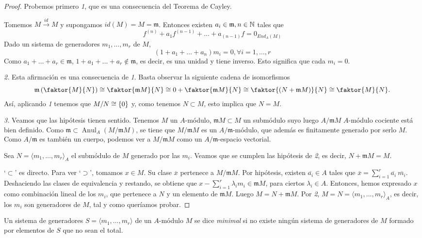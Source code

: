 \documentclass[../main.tex]{subfiles}
\begin{document}
\begin{proof}
	Probemos primero \textit{1}, que es una consecuencia del Teorema de Cayley.

	Tomemos $M\overset{id}{\longrightarrow}M$ y supongamos $id(M)=M=\mathfrak{m}$. Entonces existen $a_i\in\mathfrak{m},n\in\mathbb{N}$ tales que $$f^{(n)}+a_1f^{(n-1)}+\dots+a_{(n-1)}f=0_{End_A(M)}$$ Dado un sistema de generadores $m_1,\dots, m_r$ de $M$, $$(1+a_1+\dots+a_n)m_i=0, \forall i=1,\dots,r$$ Como $a_1+\dots+a_r\in\mathfrak{m}$, $1+a_1+\dots+a_r\notin\mathfrak{m}$, es decir, es una unidad y tiene inverso. Esto significa que cada $m_i=0$.

	\textit{2.} Esta afirmación es una consecuencia de \textit{1}. Basta observar la siguiente cadena de isomorfismos
	$$\mathfrak m\left(\faktor{M}{N}\right)\cong\faktor{\mathfrak m M}{N}\cong 0+\faktor{\mathfrak m M}{N}\cong \faktor{(N+\mathfrak m M)}{N}\cong \faktor{M}{N}.$$
	Así, aplicando \textit{1} tenemos que $M/N\cong \{0\}$ y, como tenemos $N\subset M$, esto implica que $N=M.$

	\textit{3.} Veamos que las hipótesis tienen sentido. Tenemos $M$ un $A$-módulo, $\mathfrak{m}M\subset M$ un submódulo suyo luego $A/\mathfrak{m}M$ $A$-módulo cociente está bien definido. Como $\mathfrak{m}\subset \operatorname{Anul}_A(M/\mathfrak{m}M)$, se tiene que $M/\mathfrak{m}M$ es un $A/\mathfrak{m}$-módulo, que además es finitamente generado por serlo $M$. Como $A/\mathfrak{m}$ es también un cuerpo, podemos ver a $M/\mathfrak{m}M$ como un $A/\mathfrak{m}$-espacio vectorial.

	Sea $N=\langle m_1,\dots,m_r\rangle_A$ el submódulo de $M$ generado por las $m_i$. Veamos que se cumplen las hipótesis de \textit{2}, es decir, $N+\mathfrak{m}M=M$.

	`$\subset$' es directo. Para ver `$\supset$', tomamos $x\in M$. Su clase $\overline{x}$ pertenece a $M/\mathfrak{m}M$. Por hipótesis, existen $\overline{a_i}\in A$ tales que $\overline{x}=\sum_{i=1}^{r}\overline{a_i}\ \overline{m_i}$. Deshaciendo las clases de equivalencia y restando, se obtiene que $x-\sum_{i=1}^{r}\lambda_i m_i\in\mathfrak{m}M$, para ciertos $\lambda_i\in A$. Entonces, hemos expresado $x$ como combinación lineal de los $m_i$, que pertenece a $N$ y un elemento de $\mathfrak{m}M$. Luego $M=N+\mathfrak{m}M$. Por \textit{2}, $M=N=\langle m_1,\dots,m_r\rangle_A$, es decir, los $m_i$ son generadores de $M$, tal y como queríamos probar.
\end{proof}
\begin{definition}
	Un sistema de generadores $S=\langle m_1,\dots,m_r\rangle$ de un $A$-módulo $M$ se dice \textit{minimal} si no existe ningún sistema de generadores de $M$ formado por elementos de $S$ que no sean el total.
\end{definition}
\end{document}
